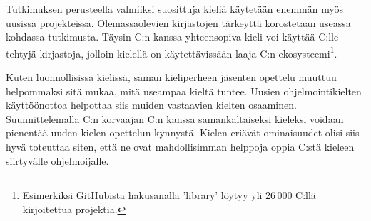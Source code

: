 Tutkimuksen perusteella valmiiksi suosittuja kieliä käytetään enemmän myös
uusissa projekteissa. Olemassaolevien kirjastojen tärkeyttä korostetaan
useassa kohdassa tutkimusta. Täysin C:n kanssa yhteensopiva kieli voi käyttää
C:lle tehtyjä kirjastoja, jolloin kielellä on käytettävissään laaja C:n
ekosysteemi\footnote{Esimerkiksi GitHubista hakusanalla 'library' löytyy yli
26\,000 C:llä kirjoitettua projektia.}.

Kuten luonnollisissa kielissä, saman kieliperheen jäsenten opettelu muuttuu
helpommaksi sitä mukaa, mitä useampaa kieltä tuntee\citationneeded. Uusien
ohjelmointikielten käyttöönottoa helpottaa siis muiden vastaavien kielten
osaaminen. Suunnittelemalla C:n korvaajan C:n kanssa samankaltaiseksi kieleksi
voidaan pienentää uuden kielen opettelun kynnystä. Kielen eriävät ominaisuudet
olisi siis hyvä toteuttaa siten, että ne ovat mahdollisimman helppoja oppia
C:stä kieleen siirtyvälle ohjelmoijalle.


%
%
%
%

